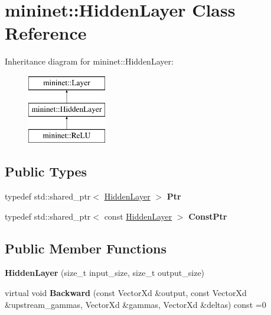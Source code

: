 \hypertarget{classmininet_1_1_hidden_layer}{}\section{mininet\+:\+:Hidden\+Layer Class Reference}
\label{classmininet_1_1_hidden_layer}
Inheritance diagram for mininet\+:\+:Hidden\+Layer\+:\begin{figure}[H]
\begin{center}
\leavevmode
\includegraphics[height=3.000000cm]{classmininet_1_1_hidden_layer}
\end{center}
\end{figure}
\subsection*{Public Types}
\begin{DoxyCompactItemize}
\item 
\hypertarget{classmininet_1_1_hidden_layer_a2be764b9978a6288b26b56f40ee9bfe4}{}\label{classmininet_1_1_hidden_layer_a2be764b9978a6288b26b56f40ee9bfe4} 
typedef std\+::shared\+\_\+ptr$<$ \hyperlink{classmininet_1_1_hidden_layer}{Hidden\+Layer} $>$ {\bfseries Ptr}
\item 
\hypertarget{classmininet_1_1_hidden_layer_a0cc783f56aa7d749862dfc4cc60f1bce}{}\label{classmininet_1_1_hidden_layer_a0cc783f56aa7d749862dfc4cc60f1bce} 
typedef std\+::shared\+\_\+ptr$<$ const \hyperlink{classmininet_1_1_hidden_layer}{Hidden\+Layer} $>$ {\bfseries Const\+Ptr}
\end{DoxyCompactItemize}
\subsection*{Public Member Functions}
\begin{DoxyCompactItemize}
\item 
\hypertarget{classmininet_1_1_hidden_layer_ae7f168cf012746112311407332886b15}{}\label{classmininet_1_1_hidden_layer_ae7f168cf012746112311407332886b15} 
{\bfseries Hidden\+Layer} (size\+\_\+t input\+\_\+size, size\+\_\+t output\+\_\+size)
\item 
\hypertarget{classmininet_1_1_hidden_layer_a8c2915edd9ea952a6ae278ebdee99c92}{}\label{classmininet_1_1_hidden_layer_a8c2915edd9ea952a6ae278ebdee99c92} 
virtual void {\bfseries Backward} (const Vector\+Xd \&output, const Vector\+Xd \&upstream\+\_\+gammas, Vector\+Xd \&gammas, Vector\+Xd \&deltas) const =0
\end{DoxyCompactItemize}
